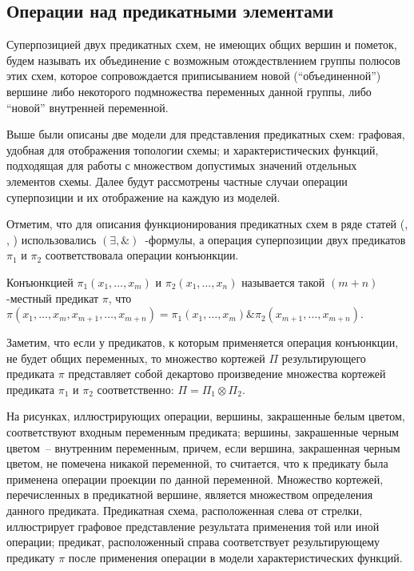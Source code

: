 \documentclass[12pt]{article}
\newenvironment{definition}[1][Определение]{\begin{trivlist}
\item[\hskip \labelsep {\bfseries #1}]}{\end{trivlist}}
\begin{document}
\subsection{Операции над предикатными элементами}

\begin{definition}
Суперпозицией двух предикатных схем, не имеющих общих вершин и пометок, 
будем называть их объединение с возможным отождествлением группы полюсов этих схем, 
которое сопровождается приписыванием новой (``объединенной'') вершине либо 
некоторого подмножества переменных данной группы, либо ``новой'' внутренней переменной.
\end{definition}

Выше были описаны две модели для представления предикатных схем: графовая, удобная для отображения топологии схемы; 
и характеристических функций, подходящая для работы с множеством допустимых значений отдельных элементов схемы. Далее 
будут рассмотрены частные случаи операции суперпозиции и их отображение на каждую из моделей.

Отметим, что для описания функционирования предикатных схем в ряде статей (\cite{Marchenkov}, \cite{Zhuk}, \cite{Shu09})
использовались $(\exists, \&)$~-формулы, а операция суперпозиции двух предикатов $\pi_1$ и $\pi_2$ соответствовала
операции конъюнкции.

\begin{definition}
Конъюнкцией $\pi_1(x_1, \dots, x_m)$ и $\pi_2(x_1, \dots, x_n)$ называется такой $(m+n)$-местный предикат $\pi$, что
$\pi(x_1, \dots, x_m, x_{m+1}, \dots, x_{m+n}) = \pi_1(x_1, \dots, x_m) \& \pi_2(x_{m+1}, \dots, x_{m+n})$.
\end{definition}

Заметим, что если у предикатов, к которым применяется операция конъюнкции,
не будет общих переменных, то множество кортежей $\Pi$ результирующего предиката 
$\pi$ представляет собой декартово произведение множества кортежей предиката $\pi_1$ и $\pi_2$ соответственно:
$\Pi = \Pi_1 \otimes \Pi_2$.

На рисунках, иллюстрирующих операции, вершины, закрашенные белым цветом, соответствуют входным переменным предиката; 
вершины, закрашенные черным цветом~-- внутренним переменным, причем, если вершина, закрашенная черным цветом, не 
помечена никакой переменной, то считается, что к предикату была применена операции проекции по данной переменной.
Множество кортежей, перечисленных в предикатной вершине, является множеством определения данного предиката. 
Предикатная схема, расположенная слева от стрелки, иллюстрирует графовое представление результата применения той или иной
операции; предикат, расположенный справа соответствует результирующему предикату $\pi$ после применения операции 
в модели характеристических функций.
\end{document}
